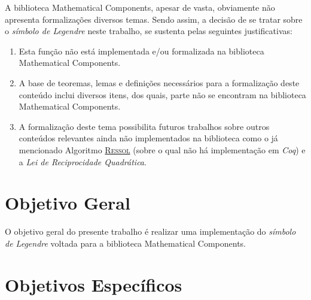 A biblioteca Mathematical Components, apesar de vasta, obviamente não apresenta formalizações diversos temas. Sendo assim, a decisão de se tratar sobre o \textit{símbolo de Legendre} neste trabalho, se sustenta pelas seguintes justificativas:
\begin{enumerate}
    \item Esta função não está implementada e/ou formalizada na biblioteca Mathematical Components.
    \item A base de teoremas, lemas e definições necessários para a formalização deste conteúdo inclui diversos itens, dos quais, parte não se encontram na biblioteca Mathematical Components.
    \item A formalização deste tema possibilita futuros trabalhos sobre outros conteúdos relevantes ainda não implementados na biblioteca como o já mencionado Algoritmo \hyperref[algo:ressol]{\textsc{Ressol}} (sobre o qual não há implementação em \textit{Coq}) e a \textit{Lei de Reciprocidade Quadrática}. 
    
\end{enumerate}

\section{Objetivo Geral}

O objetivo geral do presente trabalho é realizar uma implementação do \textit{símbolo de Legendre} voltada para a biblioteca Mathematical Components.

\section{Objetivos Específicos} \label{sec:obj-esp}

